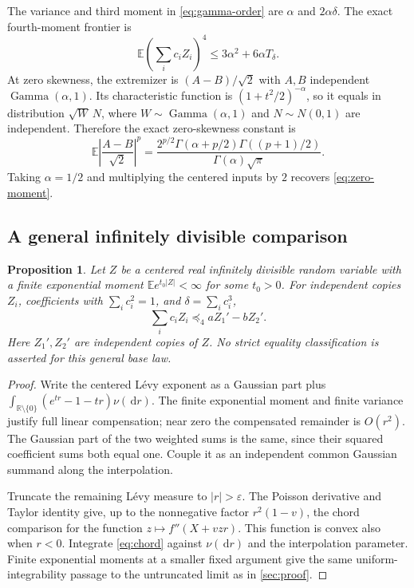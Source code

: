 \documentclass[11pt]{article}
\numberwithin{equation}{section}
\newtheorem{proposition}[theorem]{Proposition}
\theoremstyle{definition}
\theoremstyle{remark}
\newcommand{\E}{\mathbb E}
\newcommand{\R}{\mathbb R}
\newcommand{\dd}{\,\mathrm d}
\DeclareMathOperator{\GammaDist}{Gamma}
\begin{document}
The variance and third moment in \eqref{eq:gamma-order} are $\alpha$ and $2\alpha\delta$. The exact fourth-moment frontier is
\begin{equation}\label{eq:gamma-fourth}
\E\left(\sum_i c_iZ_i\right)^4
\leq3\alpha^2+6\alpha T_\delta.
\end{equation}
At zero skewness, the extremizer is $(A-B)/\sqrt2$ with $A,B$ independent $\GammaDist(\alpha,1)$. Its characteristic function is $(1+t^2/2)^{-\alpha}$, so it equals in distribution $\sqrt W\,N$, where $W\sim\GammaDist(\alpha,1)$ and $N\sim N(0,1)$ are independent. Therefore the exact zero-skewness constant is
\begin{equation}\label{eq:gamma-zero}
\E\left|\frac{A-B}{\sqrt2}\right|^p
=\frac{2^{p/2}\Gamma(\alpha+p/2)\Gamma((p+1)/2)}{\Gamma(\alpha)\sqrt\pi}.
\end{equation}
Taking $\alpha=1/2$ and multiplying the centered inputs by $2$ recovers \eqref{eq:zero-moment}.

\subsection{A general infinitely divisible comparison}
\begin{proposition}\label{prop:ID}
Let $Z$ be a centered real infinitely divisible random variable with a finite exponential moment $\E e^{t_0|Z|}<\infty$ for some $t_0>0$. For independent copies $Z_i$, coefficients with $\sum_i c_i^2=1$, and $\delta=\sum_i c_i^3$,
\[
\sum_i c_iZ_i\preceq_4 aZ_1'-bZ_2'.
\]
Here $Z_1',Z_2'$ are independent copies of $Z$. No strict equality classification is asserted for this general base law.
\end{proposition}
\begin{proof}
Write the centered L\'evy exponent as a Gaussian part plus
$\int_{\R\setminus\{0\}}(e^{tr}-1-tr)\nu(\dd r)$.
The finite exponential moment and finite variance justify full linear compensation; near zero the compensated remainder is $O(r^2)$. The Gaussian part of the two weighted sums is the same, since their squared coefficient sums both equal one. Couple it as an independent common Gaussian summand along the interpolation.

Truncate the remaining L\'evy measure to $|r|>\varepsilon$. The Poisson derivative and Taylor identity give, up to the nonnegative factor $r^2(1-v)$, the chord comparison for the function $z\mapsto f''(X+vzr)$. This function is convex also when $r<0$. Integrate \eqref{eq:chord} against $\nu(\dd r)$ and the interpolation parameter. Finite exponential moments at a smaller fixed argument give the same uniform-integrability passage to the untruncated limit as in \cref{sec:proof}.
\end{proof}
\end{document}

